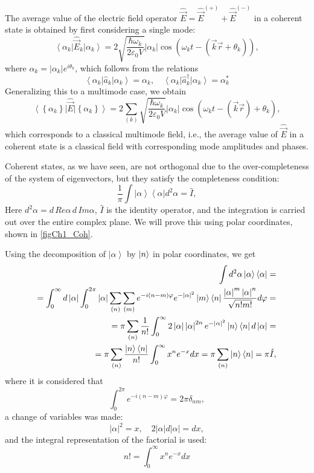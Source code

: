 The average value of the electric field operator $\hat{\vec{E}} =
\hat{\vec{E}}^{(+)} + \hat{\vec{E}}^{(-)}$ in a coherent state is obtained by first considering a single mode: 
\[
\left<\alpha_{k}\right|\hat{\vec{E}}_k\left|\alpha_{k}\right> = 2
\sqrt{\frac{\hbar \omega_k}{2 \varepsilon_0
V}}\left|\alpha_{k}\right|\cos 
\left(\omega_k t - \left(\vec{k} \vec{r} + \theta_k\right) \right),
\]
where $\alpha_k = \left|\alpha_{k}\right| e^{i \theta_k}$, which follows from the relations
\[
\left<\alpha_k\right|\hat{a}_k\left|\alpha_k\right> = \alpha_k, \quad
\left<\alpha_k\right|\hat{a}^{\dag}_k\left|\alpha_k\right> = \alpha^{*}_k
\]
Generalizing this to a multimode case, we obtain
\begin{equation}
\left<\left\{\alpha_{k}\right\}\right|\hat{\vec{E}}\left|\left\{\alpha_{k}\right\}\right>
= 2 \sum_{(k)} \sqrt{\frac{\hbar \omega_k}{2 \varepsilon_0
V}} \left|\alpha_k\right|\cos \left(\omega_k t -
\left(\vec{k}\vec{r}\right) + \theta_k \right),
\end{equation}
which corresponds to a classical multimode field, i.e., the average value of $\hat{\vec{E}}$ in a coherent state is a classical field with corresponding mode amplitudes and phases.

Coherent states, as we have seen, are not orthogonal due to the over-completeness of the system of eigenvectors, but they satisfy the completeness condition:
\begin{equation}
\frac{1}{\pi}\int \left|\alpha\right>\left<\alpha\right| d^2 \alpha =
\hat{I},
\label{eqCh1_full4coh}
\end{equation}
Here $d^2 \alpha = d\, Re \alpha\, d\, Im \alpha$, $\hat{I}$ is the identity operator, and the integration is carried out over the entire complex plane. We will prove this using polar coordinates, shown in \autoref{figCh1_Coh}.



Using the decomposition of $\left|\alpha\right>$ by $\ket{n}$ in polar coordinates, we get 
\begin{eqnarray}
\int d^2 \alpha \left|\alpha\right>\left<\alpha\right| =
\nonumber \\
=
\int_0^{\infty} d \left|\alpha\right|\int_0^{2
  \pi}\left|\alpha\right|\sum_{(n)}\sum_{(m)}e^{-i \left(n -
  m\right)\varphi}
e^{-\left|\alpha\right|^2}\ket{m}\bra{n}
\frac{\left|\alpha\right|^m \left|\alpha\right|^n}{\sqrt{n! m!}} d\varphi
= 
\nonumber \\
= \pi \sum_{(n)}\frac{1}{n!}\int_0^{\infty} 2
\left|\alpha\right|\left|\alpha\right|^{2n} e^{-\left|\alpha\right|^2} 
\ket{n}\bra{n}
d\left|\alpha\right| = 
\nonumber \\
=
\pi
\sum_{(n)}\frac{\ket{n}\bra{n}}{n!} \int_0^{\infty}x^n
e^{-x}dx = 
\pi \sum_{(n)}\ket{n}\bra{n} = \pi \hat{I},
\end{eqnarray}
where it is considered that
\[
\int_0^{2\pi} e^{-i \left(n - m\right)\varphi} = 2 \pi \delta_{nm},
\]
a change of variables was made:  
\[
\left|\alpha\right|^2 = x, \quad 2 \left|\alpha\right| d
\left|\alpha\right| = d x,
\]
and the integral representation of the factorial is used:
\[
n! = \int_0^{\infty}x^ne^{-x}dx
\]


